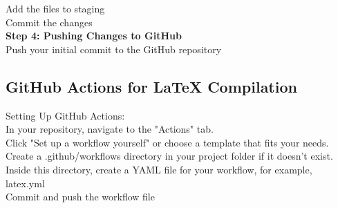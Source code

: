 \documentclass{article}
\begin{document}
Add the files to staging\\

Commit the changes\\

\textbf{Step 4: Pushing Changes to GitHub}\\

Push your initial commit to the GitHub repository\\


\subsection{GitHub Actions for LaTeX Compilation\\}
Setting Up GitHub Actions:\\
In your repository, navigate to the "Actions" tab.\\

Click "Set up a workflow yourself" or choose a template that fits your needs.\\

Create a .github/workflows directory in your project folder if it doesn't exist.\\

Inside this directory, create a YAML file for your workflow, for example, latex.yml\\

Commit and push the workflow file\\
\end{document}
